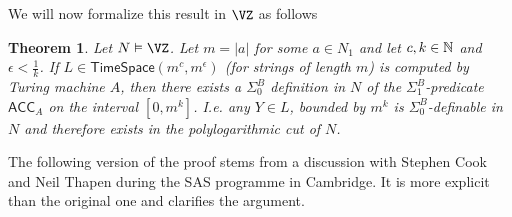 \documentclass{LMCS}
\newcommand{\Nat}{\ensuremath \mathbb N}
\newcommand{\abs}[1]{\left\vert#1\right\vert}
\newtheorem{theorem}{Theorem}[section]
\begin{document}
\noindent We will now formalize this result in $\VZ$ as follows

\begin{theorem}\label{Thm Nepomnjascij_formalized} Let $N\vDash\VZ$.
  Let $m=\abs a$ for some $a\in N_1$ and let $c,k\in\Nat$ and $\epsilon<\frac{1}{k}$. If
  $L\in\mathsf{TimeSpace}(m^c,m^{\epsilon})$ (for strings of length $m$) is computed by Turing machine $A$, then there exists a $\Sigma^B_0$
  definition in $N$ of the $\Sigma^B_1$-predicate $\mathsf{ACC}_A$ on the interval $[0,m^k]$. I.e. any $Y\in L$,
  bounded by $m^k$ is $\Sigma^B_0$-definable in $N$ and therefore exists in the polylogarithmic cut of $N$.
\end{theorem}
  The following version of the proof stems from a discussion with Stephen Cook and Neil Thapen during the SAS
  programme in Cambridge. It is more explicit than the original one and clarifies the argument.
\end{document}
